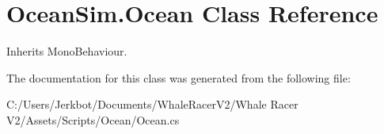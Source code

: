 \hypertarget{class_ocean_sim_1_1_ocean}{}\section{Ocean\+Sim.\+Ocean Class Reference}
\label{class_ocean_sim_1_1_ocean}


Inherits Mono\+Behaviour.



The documentation for this class was generated from the following file\+:\begin{DoxyCompactItemize}
\item 
C\+:/\+Users/\+Jerkbot/\+Documents/\+Whale\+Racer\+V2/\+Whale Racer V2/\+Assets/\+Scripts/\+Ocean/Ocean.\+cs\end{DoxyCompactItemize}
